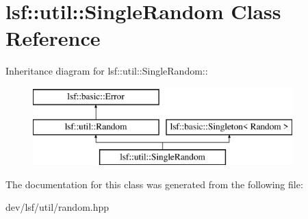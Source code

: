 \hypertarget{classlsf_1_1util_1_1SingleRandom}{
\section{lsf::util::SingleRandom Class Reference}
\label{classlsf_1_1util_1_1SingleRandom}
}
Inheritance diagram for lsf::util::SingleRandom::\begin{figure}[H]
\begin{center}
\leavevmode
\includegraphics[height=3cm]{classlsf_1_1util_1_1SingleRandom}
\end{center}
\end{figure}


The documentation for this class was generated from the following file:\begin{DoxyCompactItemize}
\item 
dev/lsf/util/random.hpp\end{DoxyCompactItemize}
